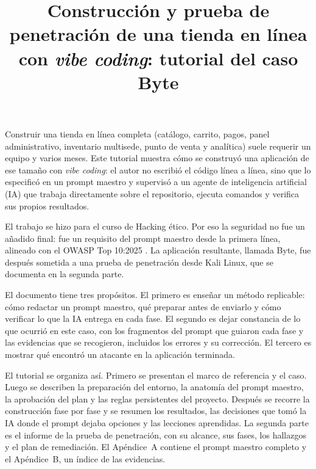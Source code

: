 \documentclass[stu,12pt,floatsintext]{apa7}
\title{Construcción y prueba de penetración de una tienda en línea con \textit{vibe coding}: tutorial del caso Byte}
\begin{document}
\maketitle
\RaggedRight

Construir una tienda en línea completa (catálogo, carrito, pagos, panel administrativo, inventario
multisede, punto de venta y analítica) suele requerir un equipo y varios meses. Este tutorial muestra
cómo se construyó una aplicación de ese tamaño con \textit{vibe coding}: el autor no escribió el código
línea a línea, sino que lo especificó en un prompt maestro y supervisó a un agente de inteligencia
artificial (IA) que trabaja directamente sobre el repositorio, ejecuta comandos y verifica sus propios
resultados.

El trabajo se hizo para el curso de Hacking ético. Por eso la seguridad no fue un añadido final: fue un
requisito del prompt maestro desde la primera línea, alineado con el OWASP Top 10:2025
\parencite{owasp2025}. La aplicación resultante, llamada Byte, fue después sometida a una prueba de
penetración desde Kali Linux, que se documenta en la segunda parte.

El documento tiene tres propósitos. El primero es enseñar un método replicable: cómo redactar un
prompt maestro, qué preparar antes de enviarlo y cómo verificar lo que la IA entrega en cada fase. El
segundo es dejar constancia de lo que ocurrió en este caso, con los fragmentos del prompt que guiaron
cada fase y las evidencias que se recogieron, incluidos los errores y su corrección. El tercero es
mostrar qué encontró un atacante en la aplicación terminada.

El tutorial se organiza así. Primero se presentan el marco de referencia y el caso. Luego se describen
la preparación del entorno, la anatomía del prompt maestro, la aprobación del plan y las reglas
persistentes del proyecto. Después se recorre la construcción fase por fase y se resumen los
resultados, las decisiones que tomó la IA donde el prompt dejaba opciones y las lecciones aprendidas.
La segunda parte es el informe de la prueba de penetración, con su alcance, sus fases, los hallazgos y
el plan de remediación. El Apéndice~A contiene el prompt maestro completo y el Apéndice~B, un índice de
las evidencias.

\end{document}
